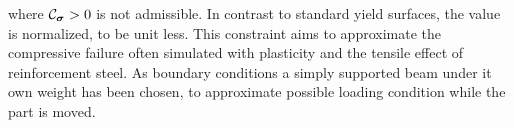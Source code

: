 where $\mathcal{C}_{\boldsymbol{\sigma}} > 0$ is not admissible.
In contrast to standard yield surfaces, the value is normalized, to be unit less.
This constraint aims to approximate the compressive failure often simulated with plasticity and the tensile effect of reinforcement steel.
As boundary conditions a simply supported beam under it own weight has been chosen, to approximate possible loading condition while the part is moved.